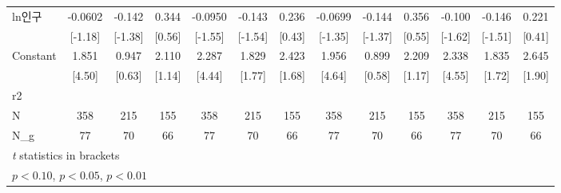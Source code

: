 \begin{tabular}{l*{12}{c}}
\addlinespace
ln인구            &     -0.0602         &      -0.142         &       0.344         &     -0.0950         &      -0.143         &       0.236         &     -0.0699         &      -0.144         &       0.356         &      -0.100         &      -0.146         &       0.221         \\
                    &     [-1.18]         &     [-1.38]         &      [0.56]         &     [-1.55]         &     [-1.54]         &      [0.43]         &     [-1.35]         &     [-1.37]         &      [0.55]         &     [-1.62]         &     [-1.51]         &      [0.41]         \\
\addlinespace
Constant            &       1.851\sym{***}&       0.947         &       2.110         &       2.287\sym{***}&       1.829\sym{*}  &       2.423\sym{*}  &       1.956\sym{***}&       0.899         &       2.209         &       2.338\sym{***}&       1.835\sym{*}  &       2.645\sym{*}  \\
                    &      [4.50]         &      [0.63]         &      [1.14]         &      [4.44]         &      [1.77]         &      [1.68]         &      [4.64]         &      [0.58]         &      [1.17]         &      [4.55]         &      [1.72]         &      [1.90]         \\
\midrule
r2                  &                     &                     &                     &                     &                     &                     &                     &                     &                     &                     &                     &                     \\
N                   &         358         &         215         &         155         &         358         &         215         &         155         &         358         &         215         &         155         &         358         &         215         &         155         \\
N\_g                 &          77         &          70         &          66         &          77         &          70         &          66         &          77         &          70         &          66         &          77         &          70         &          66         \\
\bottomrule
\multicolumn{13}{l}{\footnotesize \textit{t} statistics in brackets}\\
\multicolumn{13}{l}{\footnotesize \sym{*} \(p<0.10\), \sym{**} \(p<0.05\), \sym{***} \(p<0.01\)}\\
\end{tabular}